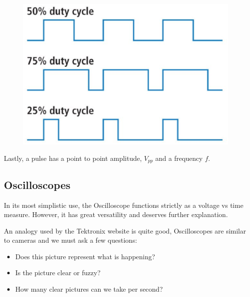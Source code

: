 \documentclass{article}
\begin{document}
\begin{figure}[!phbt]
    \centering
    \includegraphics[width=0.45\linewidth]{img/dutycycle.eps}
    \label{fig:dutycycle}
\end{figure}

Lastly, a pulse has a point to point amplitude, $V_{pp}$ and a frequency $f$.

\subsection{Oscilloscopes}
In its most simplistic use, the Oscilloscope functions strictly as a voltage vs time measure. However, it has great versatility and deserves further explanation.

An analogy used by the Tektronix website is quite good, Oscilloscopes are similar to cameras and we must ask a few questions:
\begin{itemize}
    \item Does this picture represent what is happening?
    \item Is the picture clear or fuzzy?
    \item How many clear pictures can we take per second?
\end{itemize}
\end{document}

